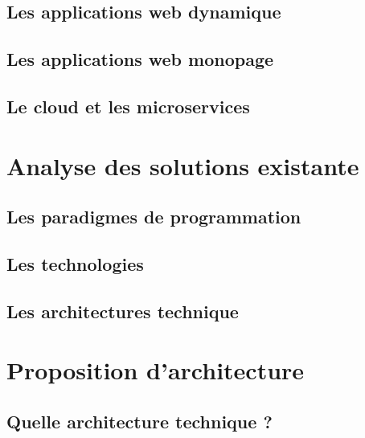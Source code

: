 \documentclass[twoside, 12pt]{report}
\begin{document}
        \section{Les applications web dynamique}
    		
        
        \section{Les applications web monopage}
    		
        
        \section{Le cloud et les microservices}
    		
        
	\chapter{Analyse des solutions existante}
    	
    	
        \section{Les paradigmes de programmation}
    		
        
        \section{Les technologies}
    		
        
        \section{Les architectures technique}
    		
        
    \chapter{Proposition d'architecture}
    	
    
    	\section{Quelle architecture technique ?}
    		
    
\end{document}
